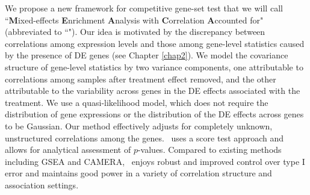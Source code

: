 %	
	
	
	
	We propose a new framework for competitive gene-set test that we will call 
	``\textbf{M}ixed-effects \textbf{E}nrichment \textbf{A}nalysis with \textbf{C}orrelation 
	\textbf{A}ccounted for" 
	(abbreviated to ``\OurMethod"). Our idea is motivated by the discrepancy between correlations
	among expression levels and those among gene-level statistics caused by the presence of DE 
	genes (see Chapter \ref{chap2}). 
	We model the covariance structure of gene-level statistics by two 
	variance components, one attributable to correlations among samples after treatment effect 
	removed, and the other attributable to the variability across genes in the DE effects 
	associated with the treatment. 
	We use a quasi-likelihood model, which does not require the distribution of gene expressions or 
	the distribution of the DE effects across genes to be Gaussian. Our method effectively 
	adjusts for completely unknown,	unstructured correlations among the genes. \OurMethod~uses a 
	score test approach and allows for analytical assessment of $p$-values. Compared to existing 
	methods including GSEA and CAMERA, \OurMethod~enjoys robust and improved control over type I 
	error and maintains good power in a	variety of correlation structure and association settings. 
	
